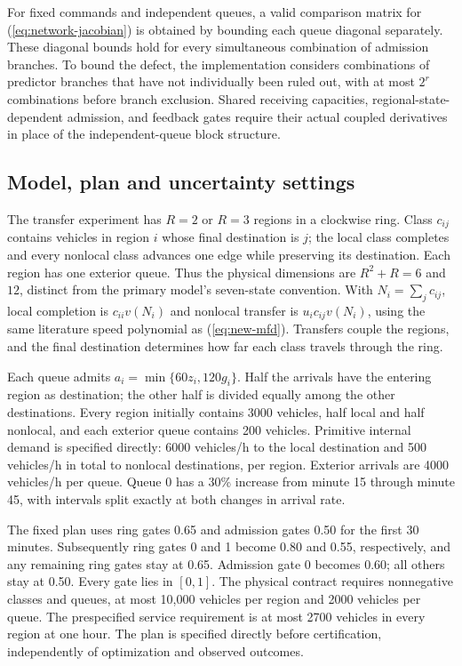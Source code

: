 \documentclass[journal,10pt]{IEEEtran}
\begin{document}
For fixed commands and independent queues, a valid comparison matrix for
(\ref{eq:network-jacobian}) is obtained by bounding each queue diagonal
separately. These diagonal bounds hold for every simultaneous combination
of admission branches. To bound the defect, the implementation considers
combinations of predictor branches that have not individually been ruled
out, with at most $2^r$ combinations before branch exclusion. Shared receiving capacities,
regional-state-dependent admission, and feedback gates require their actual
coupled derivatives in place of the independent-queue block structure.

\subsection{Model, plan and uncertainty settings}

The transfer experiment has $R=2$ or $R=3$ regions in a clockwise ring. Class
$c_{ij}$ contains vehicles in region $i$ whose final destination is $j$;
the local class completes and every nonlocal class advances one edge while
preserving its destination. Each region has one exterior queue. Thus the
physical dimensions are $R^2+R=6$ and $12$, distinct from the primary model's
seven-state convention. With $N_i=\sum_jc_{ij}$, local completion is
$c_{ii}v(N_i)$ and nonlocal transfer is $u_i c_{ij}v(N_i)$, using the same
literature speed polynomial as (\ref{eq:new-mfd}). Transfers couple the
regions, and the final destination determines how
far each class travels through the ring.

Each queue admits $a_i=\min\{60z_i,120g_i\}$. Half the arrivals have the
entering region as destination; the other half is divided equally among the
other destinations. Every region initially contains 3000 vehicles, half
local and half nonlocal, and each exterior queue contains 200 vehicles.
Primitive internal demand is specified directly: 6000 vehicles/h to the local
destination and 500 vehicles/h in total to nonlocal destinations, per region.
Exterior arrivals are 4000 vehicles/h per queue. Queue 0 has a 30\% increase
from minute 15 through minute 45, with intervals split exactly at both changes in arrival rate.

The fixed plan uses ring gates 0.65 and admission gates 0.50 for the first
30 minutes. Subsequently ring gates 0 and 1 become 0.80 and 0.55, respectively,
and any remaining ring gates stay at 0.65. Admission gate 0 becomes 0.60;
all others stay at 0.50. Every gate lies in $[0,1]$. The physical contract
requires nonnegative classes and queues, at most 10,000 vehicles per region
and 2000 vehicles per queue. The prespecified service requirement is at most
2700 vehicles in every region at one hour. The plan is specified directly
before certification, independently of optimization and observed outcomes.
\end{document}
